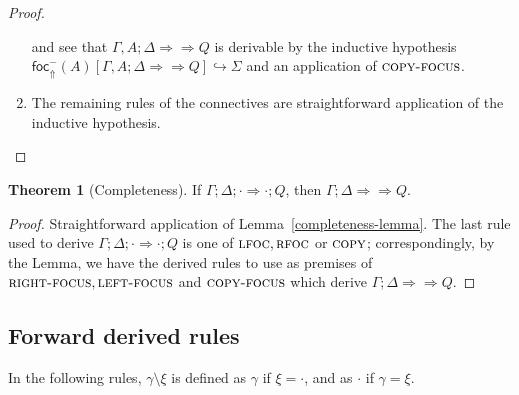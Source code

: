 \documentclass{article}
\theoremstyle{definition}
\newtheorem{theorem}{Theorem}
\newcommand{\bneuseqsymb}{
  \mathrel{\Longrightarrow\!\!\!\!\!\!\!\!\Longrightarrow}}
\newcommand{\bneuseq}[3]{#1 ; #2 \bneuseqsymb #3}
\newcommand{\blfrel}[1]{\textsf{foc}^-_{\Uparrow}(#1)}
\newcommand{\relj}[3]{#1 [#2] \hookrightarrow #3}
\newcommand{\btriseq}[4]{#1; #2; #3 \Longrightarrow #4}
\newcommand{\rfoc}{\textsc{rfoc}}
\newcommand{\lfoc}{\textsc{lfoc}}
\newcommand{\rightfocusrule}{\textsc{right-focus}}
\newcommand{\leftfocusrule}{\textsc{left-focus}}
\newcommand{\copyfocusrule}{\textsc{copy-focus}}
\newcommand{\copyrule}{\textsc{copy}}
\begin{document}
\begin{proof}
\begin{enumerate}
    and see that $\bneuseq{\Gamma, A}{\Delta}{Q}$ is derivable by
    the inductive hypothesis
    $\relj{\blfrel{A}}{\bneuseq{\Gamma,A}{\Delta}{Q}}{\Sigma}$ and an application
    of $\copyfocusrule$.
  \item The remaining rules of the connectives are straightforward application
    of the inductive hypothesis.
  \end{enumerate}
\end{proof}

\begin{theorem}[Completeness]
  If $\btriseq{\Gamma}{\Delta}{\cdot}{\cdot ; Q}$, then
  $\bneuseq{\Gamma}{\Delta}{Q}$.
\end{theorem}
\begin{proof}
  Straightforward application of Lemma~\ref{completeness-lemma}. The last rule
  used to derive $\btriseq{\Gamma}{\Delta}{\cdot}{\cdot ; Q}$ is one of
  $\lfoc, \rfoc$ or $\copyrule$; correspondingly, by the Lemma, we have the
  derived rules to use as premises of $\rightfocusrule, \leftfocusrule$ and
  $\copyfocusrule$ which derive $\bneuseq{\Gamma}{\Delta}{Q}$.
\end{proof}

\subsection{Forward derived rules}

In the following rules, $\gamma \setminus \xi$ is defined as $\gamma$ if $\xi = \cdot$,
and as $\cdot$ if $\gamma = \xi$.
\end{document}
